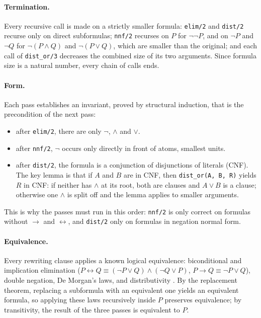 \documentclass[11pt]{article}
\begin{document}
\paragraph{Termination.} Every recursive call is made on a strictly smaller
formula: \texttt{elim/2} and \texttt{dist/2} recurse only on direct
subformulas; \texttt{nnf/2} recurses on $P$ for $\neg\neg P$, and on $\neg P$
and $\neg Q$ for $\neg(P \land Q)$ and $\neg(P \lor Q)$, which are smaller than the
original; and each call of \texttt{dist\_or/3} decreases the combined size of
its two arguments. Since formula size is a natural number, every chain of calls
ends.

\paragraph{Form.} Each pass establishes an invariant, proved by structural
induction, that is the precondition of the next pass:
\begin{itemize}
    \item after \texttt{elim/2}, there are only $\neg$, $\land$ and $\lor$.
    \item after \texttt{nnf/2}, $\neg$ occurs only directly in front of atoms, smallest units.
    \item after \texttt{dist/2}, the formula is a conjunction of disjunctions of
          literals (CNF). The key lemma is that if $A$ and $B$ are in CNF, then
          \texttt{dist\_or(A, B, R)} yields $R$ in CNF: if neither has $\land$ at
          its root, both are clauses and $A \lor B$ is a clause; otherwise one
          $\land$ is split off and the lemma applies to smaller arguments.
\end{itemize}
This is why the passes must run in this order: \texttt{nnf/2} is only correct on
formulas without $\rightarrow$ and $\leftrightarrow$, and \texttt{dist/2} only on
formulas in negation normal form.

\paragraph{Equivalence.} Every rewriting clause applies a known logical
equivalence: biconditional and implication elimination
($P \leftrightarrow Q \equiv (\neg P \lor Q) \land (\neg Q \lor P)$,
$P \rightarrow Q \equiv \neg P \lor Q$), double negation, De Morgan's laws,
and distributivity \cite{huthLogicComputerScience2004}. By the replacement theorem, replacing a subformula with an
equivalent one yields an equivalent formula, so applying these laws recursively
inside $P$ preserves equivalence; by transitivity, the result of the three
passes is equivalent to $P$.
\end{document}

